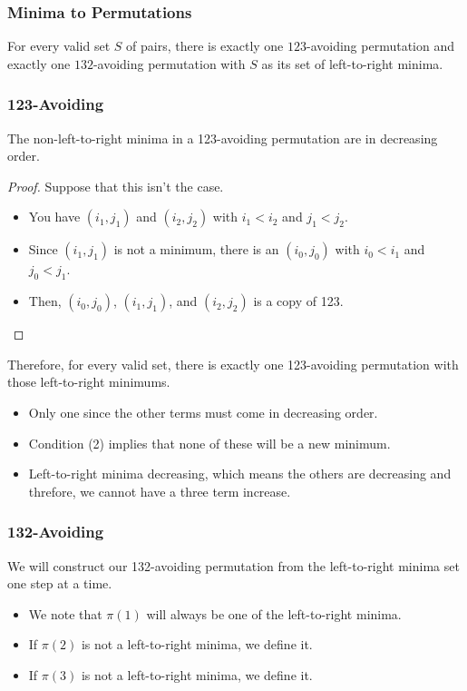 \documentclass[letterpaper]{article}
\begin{document}
\subsubsection{Minima to Permutations}
\begin{proposition}
    For every valid set $S$ of pairs, there is exactly one $123$-avoiding permutation and exactly one $132$-avoiding permutation with $S$ as its set of left-to-right minima. 
\end{proposition}


\subsubsection{123-Avoiding}
\begin{lemma}{}{}
    The non-left-to-right minima in a 123-avoiding permutation are in decreasing order.
\end{lemma}

\begin{proof}
    Suppose that this isn't the case.
    \begin{itemize}
        \item You have $(i_1, j_1)$ and $(i_2, j_2)$ with $i_1 < i_2$ and $j_1 < j_2$. 
        \item Since $(i_1, j_1)$ is not a minimum, there is an $(i_0, j_0)$ with $i_0 < i_1$ and $j_0 < j_1$. 
        \item Then, $(i_0, j_0)$, $(i_1, j_1)$, and $(i_2, j_2)$ is a copy of 123. \qedhere
    \end{itemize}
\end{proof}

Therefore, for every valid set, there is exactly one 123-avoiding permutation with those left-to-right minimums. 
\begin{itemize}
    \item Only one since the other terms must come in decreasing order. 
    \item Condition (2) implies that none of these will be a new minimum. 
    \item Left-to-right minima decreasing, which means the others are decreasing and threfore, we cannot have a three term increase.
\end{itemize}

\subsubsection{132-Avoiding}
We will construct our 132-avoiding permutation from the left-to-right minima set one step at a time.
\begin{itemize}
    \item We note that $\pi(1)$ will always be one of the left-to-right minima. 
    \item If $\pi(2)$ is not a left-to-right minima, we define it. 
    \item If $\pi(3)$ is not a left-to-right minima, we define it.
\end{itemize}
\end{document}
